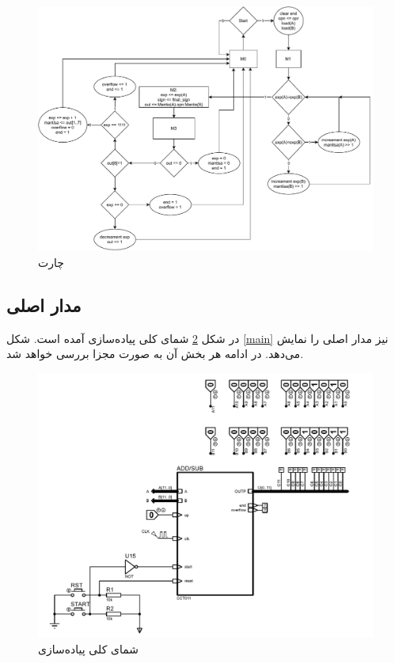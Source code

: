 \documentclass{article}
\begin{document}
\begin{figure}
	\centering
	\includegraphics[scale=0.5]{./graphics/asm}
	\caption{چارت}
	\label{asm}
\end{figure}

\subsection{مدار اصلی}
در شکل \ref{base} شمای کلی پیاده‌سازی آمده است. شکل \ref{main} نیز مدار اصلی را نمایش می‌دهد. در ادامه هر بخش آن به صورت مجزا بررسی خواهد شد.

\begin{figure}
	\centering
	\includegraphics[scale=0.5, page=1]{./graphics/graphics}
	\caption{شمای کلی پیاده‌سازی}
	\label{base}
\end{figure}
\end{document}
